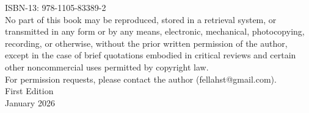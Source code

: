 {{\begin{flushleft}
    ISBN-13: 978-1105-83389-2\\[1\baselineskip]
   
    No part of this book may be reproduced, stored in a retrieval system, or transmitted in any form or by any means, electronic, mechanical, photocopying, recording, or otherwise, without the prior written permission of the author, except in the case of brief quotations embodied in critical reviews and certain other noncommercial uses permitted by copyright law.\\[1\baselineskip]
    
    For permission requests, please contact the author (fellahst@gmail.com).\\[1.5\baselineskip]
    
    First Edition\\[0.3\baselineskip]
    
    January 2026
    \end{flushleft}
    \vspace*{\fill}
    \newpage
  }
}
\makeatother

\setcounter{part}{0}

\makeatletter
\newcommand{\mypart}[1]{%
  \cleardoublepage%
  \stepcounter{part}%
  \phantomsection%
  \addcontentsline{toc}{part}{\partname\space\Roman{part}: #1}%
  \thispagestyle{empty}%
  \vspace*{\fill}%
  \begin{center}%
    \Huge\bfseries \partname\space\Roman{part}\\[0.5\baselineskip]%
    \Huge\bfseries #1%
  \end{center}%
  \vspace*{\fill}%
  \clearpage%
  \markboth{}{}%
}
\makeatother

\newcommand{\myepilogue}[2]{%
  \cleardoublepage%
  \phantomsection%
  \bookmarksetup{startatroot}%
  \addcontentsline{toc}{part}{#1}%
  \thispagestyle{empty}%
  \vspace*{\fill}%
  \begin{center}%
    \Huge\bfseries #1\\[0.5\baselineskip]%
    \Large\itshape #2%
  \end{center}%
  \vspace*{\fill}%
  \clearpage%
}

